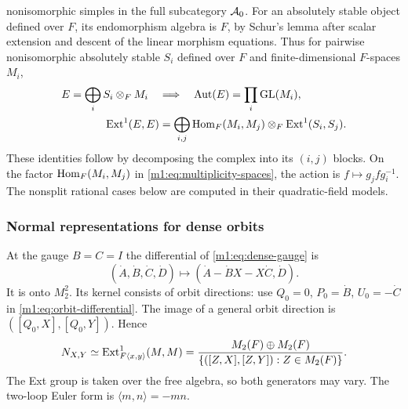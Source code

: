 nonisomorphic simples in the full subcategory $\mathcal A_0$. For an
absolutely stable object defined over $F$, its endomorphism algebra is
$F$, by Schur's lemma after scalar extension and descent of the linear
morphism equations. Thus for pairwise nonisomorphic absolutely stable
$S_i$ defined over $F$ and finite-dimensional $F$-spaces $M_i$,
\begin{equation}\label{m1:eq:multiplicity-spaces}
 \begin{split}
 E=\bigoplus_i S_i\otimes_F M_i\quad&\Longrightarrow\quad
 \operatorname{Aut}(E)=\prod_i\operatorname{GL}(M_i),\\
 \operatorname{Ext}^1(E,E)&=\bigoplus_{i,j}
 \operatorname{Hom}_F(M_i,M_j)\otimes_F\operatorname{Ext}^1(S_i,S_j).
 \end{split}
\end{equation}
These identities follow by decomposing the complex into its $(i,j)$
blocks. On the factor $\operatorname{Hom}_F(M_i,M_j)$ in \eqref{m1:eq:multiplicity-spaces}, the action is $f\mapsto g_jfg_i^{-1}$.
The nonsplit rational cases below are computed in their quadratic-field models.

\subsubsection{Normal representations for dense orbits}\label{m1:subsec:dense-normals}
At the gauge $B=C=I$ the differential of \eqref{m1:eq:dense-gauge} is
\[
 (\dot A,\dot B,\dot C,\dot D)\longmapsto
 (\dot A-\dot B X-X\dot C,\dot D).
\]
It is onto $M_2^2$. Its kernel consists of orbit directions: use
$Q_0=0$, $P_0=\dot B$, $U_0=-\dot C$ in
\eqref{m1:eq:orbit-differential}. The image of a general orbit direction
is $([Q_0,X],[Q_0,Y])$. Hence
\begin{equation}\label{m1:eq:dense-normal}
 N_{X,Y}\simeq\operatorname{Ext}^1_{F\langle x,y\rangle}(M,M)
 =\frac{M_2(F)\oplus M_2(F)}
 {\{([Z,X],[Z,Y]):Z\in M_2(F)\}}.
\end{equation}
The Ext group is taken over the free algebra, so both generators may
vary. The two-loop Euler form is
$\langle m,n\rangle=-mn$.

